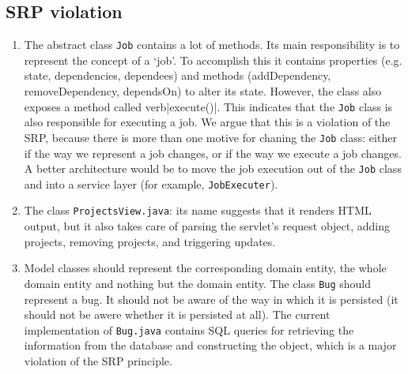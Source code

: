 \documentclass{article}
\begin{document}
\subsection{SRP violation}
\label{sec:srp}
\begin{enumerate}
\item The abstract class \verb|Job| contains a lot of methods. Its main responsibility is to represent the concept of a `job'. To accomplish this it contains properties (e.g. state, dependencies, dependees) and methods (addDependency, removeDependency, dependsOn) to alter its state. However, the class also exposes a method called verb|execute()|. This indicates that the \verb|Job| class is also responsible for executing a job. We argue that this is a violation of the SRP, because there is more than one motive for chaning the \verb|Job| class: either if the way we represent a job changes, or if the way we execute a job changes. A better architecture would be to move the job execution out of the \verb|Job| class and into a service layer (for example, \verb|JobExecuter|).


\item The class \verb|ProjectsView.java|: its name suggests that it renders HTML output, but it also takes care of parsing the servlet's request object, adding projects, removing projects, and triggering updates.

\item Model classes should represent the corresponding domain entity, the whole domain entity and nothing but the domain entity. The class \verb|Bug| should represent a bug. It should not be aware of the way in which it is persisted (it should not be awere whether it is persisted at all). The current implementation of \verb|Bug.java| contains SQL queries for retrieving the information from the database and constructing the object, which is a major violation of the SRP principle.

\end{enumerate}
\end{document}
